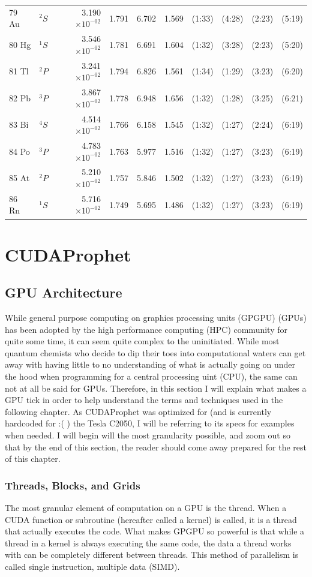 \documentclass[12pt]{report}
\begin{document}
\begin{longtable}{l l r r r r r r r r}
79 Au & $^{2}S$ & 3.190$\times10^{-02}$ & 1.791 & 6.702 & 1.569 & (1:33) & (4:28) & (2:23) & (5:19) \\
80 Hg & $^{1}S$ & 3.546$\times10^{-02}$ & 1.781 & 6.691 & 1.604 & (1:32) & (3:28) & (2:23) & (5:20) \\
81 Tl & $^{2}P$ & 3.241$\times10^{-02}$ & 1.794 & 6.826 & 1.561 & (1:34) & (1:29) & (3:23) & (6:20) \\
82 Pb & $^{3}P$ & 3.867$\times10^{-02}$ & 1.778 & 6.948 & 1.656 & (1:32) & (1:28) & (3:25) & (6:21) \\
83 Bi & $^{4}S$ & 4.514$\times10^{-02}$ & 1.766 & 6.158 & 1.545 & (1:32) & (1:27) & (2:24) & (6:19) \\
84 Po & $^{3}P$ & 4.783$\times10^{-02}$ & 1.763 & 5.977 & 1.516 & (1:32) & (1:27) & (3:23) & (6:19) \\
85 At & $^{2}P$ & 5.210$\times10^{-02}$ & 1.757 & 5.846 & 1.502 & (1:32) & (1:27) & (3:23) & (6:19) \\
86 Rn & $^{1}S$ & 5.716$\times10^{-02}$ & 1.749 & 5.695 & 1.486 & (1:32) & (1:27) & (3:23) & (6:19) \\
\end{longtable}


\chapter{CUDAProphet}
\section{GPU Architecture}
While general purpose computing on graphics processing units (GPGPU) (GPUs) has been adopted by the high performance computing (HPC) community for quite some time, it can seem quite complex to the uninitiated. While most quantum chemists who decide to dip their toes into computational waters can get away with having little to no understanding of what is actually going on under the hood when programming for a central processing uint (CPU), the same can not at all be said for GPUs. Therefore, in this section I will explain what makes a GPU tick in order to help understand the terms and techniques used in the following chapter. As CUDAProphet was optimized for (and is currently hardcoded for :( ) the Tesla C2050, I will be referring to its specs for examples when needed. I will begin will the most granularity possible, and zoom out so that by the end of this section, the reader should come away prepared for the rest of this chapter.

\subsection{Threads, Blocks, and Grids}\label{ThBlGr}
The most granular element of computation on a GPU is the thread. When a CUDA function or subroutine (hereafter called a kernel) is called, it is a thread that actually executes the code. What makes GPGPU so powerful is that while a thread in a kernel is always executing the same code, the data a thread works with can be completely different between threads. This method of parallelism is called single instruction, multiple data (SIMD). 
\end{document}

